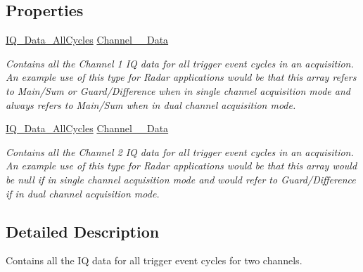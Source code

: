 \subsection*{Properties}
\begin{DoxyCompactItemize}
\item 
\mbox{\hyperlink{class_c_s_i_1_1_library_1_1_signal_processing_1_1_r_f_1_1_i_q___processing_1_1_i_q___data___all_cycles}{I\+Q\+\_\+\+Data\+\_\+\+All\+Cycles}} \mbox{\hyperlink{class_c_s_i_1_1_library_1_1_signal_processing_1_1_r_f_1_1_i_q___processing_1_1_dual_channel___i_q___data___all_cycles_a09fc234a5e8c209487fa5b112fcadea5}{Channel\+\_\+\_\+\+Data}}
\begin{DoxyCompactList}\small\item\em Contains all the Channel 1 IQ data for all trigger event cycles in an acquisition. An example use of this type for Radar applications would be that this array refers to Main/\+Sum or Guard/\+Difference when in single channel acquisition mode and always refers to Main/\+Sum when in dual channel acquisition mode. \end{DoxyCompactList}\item 
\mbox{\hyperlink{class_c_s_i_1_1_library_1_1_signal_processing_1_1_r_f_1_1_i_q___processing_1_1_i_q___data___all_cycles}{I\+Q\+\_\+\+Data\+\_\+\+All\+Cycles}} \mbox{\hyperlink{class_c_s_i_1_1_library_1_1_signal_processing_1_1_r_f_1_1_i_q___processing_1_1_dual_channel___i_q___data___all_cycles_ae13c07e8518e3a80a7a522fdf15ed58a}{Channel\+\_\+\_\+\+Data}}
\begin{DoxyCompactList}\small\item\em Contains all the Channel 2 IQ data for all trigger event cycles in an acquisition. An example use of this type for Radar applications would be that this array would be null if in single channel acquisition mode and would refer to Guard/\+Difference if in dual channel acquisition mode. \end{DoxyCompactList}\end{DoxyCompactItemize}


\subsection{Detailed Description}
Contains all the IQ data for all trigger event cycles for two channels. 



